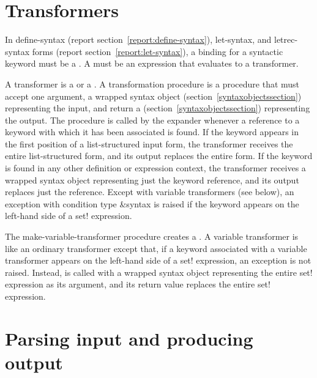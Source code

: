 \section{Transformers}
\label{transformerssection}

In {\cf define-syntax} (report section~\ref{report:define-syntax}), {\cf
  let-syntax}, and {\cf letrec-syntax} forms
(report section~\ref{report:let-syntax}), a binding for a syntactic keyword must be
a .  A  must be an
expression that evaluates to a transformer.

A transformer is a  or a
.
A transformation procedure is a procedure that must accept one
argument, a wrapped syntax object (section~\ref{syntaxobjectssection})
representing the input, and return a 
(section~\ref{syntaxobjectssection}) representing the output.
The procedure is called by the expander whenever a reference to
a keyword with which it has been associated is found.
If the keyword appears in the first position of a list-structured
input form, the transformer receives the entire list-structured
form, and its output replaces the entire form.
If the keyword is found in any other definition or expression
context, the transformer receives a wrapped syntax object representing
just the keyword reference, and its output replaces just the reference.
Except with variable transformers (see below), an exception with condition
type {\cf\&syntax} is raised if the keyword appears on the left-hand side
of a {\cf set!} expression.

\begin{entry}{%
}


The {\cf make-variable-transformer} procedure creates a
.
A variable transformer is like an ordinary transformer except
that, if a keyword associated with a variable transformer appears on
the left-hand side of a {\cf set!} expression, an exception is
not raised.
Instead,  is called with a
wrapped syntax object representing the entire {\cf set!} expression as
its argument, and its return value replaces the entire {\cf set!}
expression.
\end{entry}

\section{Parsing input and producing output}
\label{syntaxcasesection}

